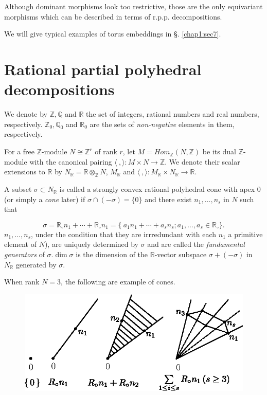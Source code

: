 Although dominant morphisms look too restrictive, those are the only
equivariant morphisms which can be described in terms of
r.p.p. decompositions. 

We will give typical examples of torus embeddings in \S. \ref{chap1:sec7}.

\section{Rational partial polyhedral decompositions}\label{chap1:sec3}

We denote by $\mathbb{Z}, \mathbb{Q}$ and $\mathbb{R}$ the set of integers,
rational numbers and real numbers, respectively. $\mathbb{Z}_0,
\mathbb{Q}_0$ and $\mathbb{R}_0$ are the sets of \textit{non-negative} elements
in them, respectively. 

For a free $\mathbb{Z}$-module $N \cong \mathbb{Z}^r$ of rank $r$, let
$M = Hom_{\mathbb{Z}}(N,\mathbb{Z})$ be its dual $\mathbb{Z}$-module
with the canonical pairing $\langle ~, \rangle : M \times N
\rightarrow \mathbb{Z}$. We denote their scalar extensions to $\mathbb{R}$ by
$N_{\mathbb{R}} = \mathbb{R} \otimes_{\mathbb{Z}} N$, $M_{\mathbb{R}}$ and $\langle
~,\rangle : M_{\mathbb{R}} \times N_{\mathbb{R}} \rightarrow \mathbb{R}$. 

\begin{defi*}
A subset $\sigma \subset N_{\mathbb{R}}$ is called a strongly convex rational
polyhedral cone with apex $0$ (or simply a {\em{cone}} later) if
$\sigma \cap (- \sigma) = \{ 0\}$ and there exist $n_1,\ldots, n_s$ in
$N$ such that 
\end{defi*}
$$
\sigma = \mathbb{R}_\circ n_1 +\cdots+\mathbb{R}_\circ n_1= \{\ a_1
n_1 +\cdots + a_s n_s ; a_1 ,\ldots , a_s \in \mathbb{R}_\circ \}. 
$$\pageoriginale
$n_1,\ldots, n_s $, under the condition that they are irrredundant
with each $n_1$ a primitive element of $N$), are uniquely determined
by $\sigma$ and are called the \textit{ fundamental generators } of
$\sigma. \dim \sigma$ is the dimension of the $\mathbb{R}$-vector
subspace $\sigma + ( - \sigma)$ in $N_{\mathbb{R}}$ generated by
$\sigma$.  

	When rank $N =3$, the following are example of cones.  
\begin{figure}[H]
\centering 
\includegraphics{vol58-fig/fig58-1.eps} 
\end{figure}

